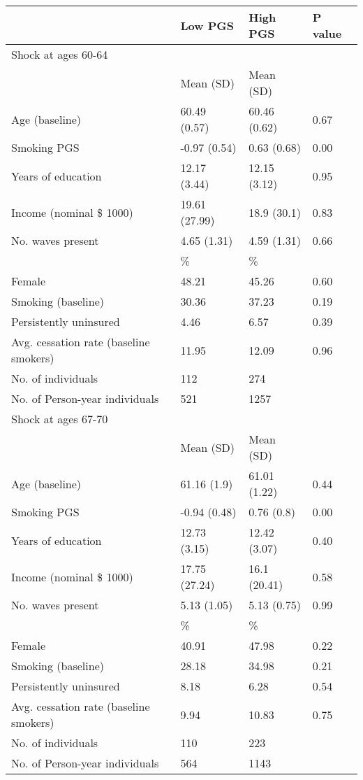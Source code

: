 % 
\begin{tabular}{llll}
  \toprule
\textbf{  } & \textbf{ Low PGS } & \textbf{ High PGS } & \textbf{ P value } \\ 
  \midrule
Shock at ages 60-64 &  &  &  \\ 
   \midrule
 & Mean (SD) & Mean (SD) &  \\ 
  Age (baseline) & 60.49 (0.57) & 60.46 (0.62) & 0.67 \\ 
  Smoking PGS & -0.97 (0.54) & 0.63 (0.68) & 0.00 \\ 
  Years of education & 12.17 (3.44) & 12.15 (3.12) & 0.95 \\ 
  Income (nominal \$ 1000) & 19.61 (27.99) & 18.9 (30.1) & 0.83 \\ 
  No. waves present & 4.65 (1.31) & 4.59 (1.31) & 0.66 \\ 
   & \% & \% &  \\ 
  Female & 48.21 & 45.26 & 0.60 \\ 
  Smoking (baseline) & 30.36 & 37.23 & 0.19 \\ 
  Persistently uninsured & 4.46 & 6.57 & 0.39 \\ 
  Avg. cessation rate (baseline smokers) & 11.95 & 12.09 & 0.96 \\ 
  No. of individuals & 112 & 274 &  \\ 
   \midrule
No. of Person-year individuals & 521 & 1257 &  \\ 
   \midrule
Shock at ages 67-70 &  &  &  \\ 
   & Mean (SD) & Mean (SD) &  \\ 
  Age (baseline) & 61.16 (1.9) & 61.01 (1.22) & 0.44 \\ 
  Smoking PGS & -0.94 (0.48) & 0.76 (0.8) & 0.00 \\ 
  Years of education & 12.73 (3.15) & 12.42 (3.07) & 0.40 \\ 
  Income (nominal \$ 1000) & 17.75 (27.24) & 16.1 (20.41) & 0.58 \\ 
  No. waves present & 5.13 (1.05) & 5.13 (0.75) & 0.99 \\ 
   & \% & \% &  \\ 
  Female & 40.91 & 47.98 & 0.22 \\ 
  Smoking (baseline) & 28.18 & 34.98 & 0.21 \\ 
  Persistently uninsured & 8.18 & 6.28 & 0.54 \\ 
  Avg. cessation rate (baseline smokers) & 9.94 & 10.83 & 0.75 \\ 
   \midrule
No. of individuals & 110 & 223 &  \\ 
  No. of Person-year individuals & 564 & 1143 &  \\ 
  \end{tabular}
